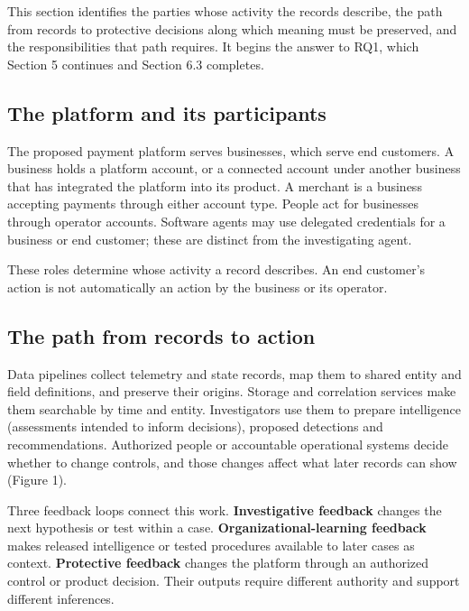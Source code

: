 \documentclass[acmlarge,review,anonymous,nonacm]{acmart}
\begin{document}
This section identifies the parties whose activity the records describe,
the path from records to protective decisions along which meaning must
be preserved, and the responsibilities that path requires. It begins the
answer to RQ1, which Section 5 continues and Section 6.3 completes.

\hypertarget{the-platform-and-its-participants}{%
\subsection{The platform and its
participants}\label{the-platform-and-its-participants}}

The proposed payment platform serves businesses, which serve end
customers. A business holds a platform account, or a connected account
under another business that has integrated the platform into its
product. A merchant is a business accepting payments through either
account type. People act for businesses through operator accounts.
Software agents may use delegated credentials for a business or end
customer; these are distinct from the investigating agent.

These roles determine whose activity a record describes. An end
customer's action is not automatically an action by the business or its
operator.

\hypertarget{the-path-from-records-to-action}{%
\subsection{The path from records to
action}\label{the-path-from-records-to-action}}

Data pipelines collect telemetry and state records, map them to shared
entity and field definitions, and preserve their origins. Storage and
correlation services make them searchable by time and entity.
Investigators use them to prepare intelligence (assessments intended to
inform decisions), proposed detections and recommendations. Authorized
people or accountable operational systems decide whether to change
controls, and those changes affect what later records can show (Figure
1).

Three feedback loops connect this work. \textbf{Investigative feedback}
changes the next hypothesis or test within a case.
\textbf{Organizational-learning feedback} makes released intelligence or
tested procedures available to later cases as context.
\textbf{Protective feedback} changes the platform through an authorized
control or product decision. Their outputs require different authority
and support different inferences.
\end{document}
